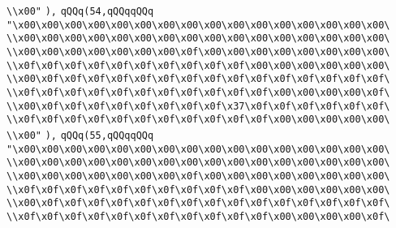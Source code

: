 \verb|\\x00"|\newline
\verb|),|\newline
\verb|qQQq(54,qQQqqQQq|\newline
\verb|"\x00\x00\x00\x00\x00\x00\x00\x00\x00\x00\x00\x00\x00\x00\x00\x00\|\newline
\verb|\\x00\x00\x00\x00\x00\x00\x00\x00\x00\x00\x00\x00\x00\x00\x00\x00\|\newline
\verb|\\x00\x00\x00\x00\x00\x00\x00\x0f\x00\x00\x00\x00\x00\x00\x00\x00\|\newline
\verb|\\x0f\x0f\x0f\x0f\x0f\x0f\x0f\x0f\x0f\x0f\x00\x00\x00\x00\x00\x00\|\newline
\verb|\\x00\x0f\x0f\x0f\x0f\x0f\x0f\x0f\x0f\x0f\x0f\x0f\x0f\x0f\x0f\x0f\|\newline
\verb|\\x0f\x0f\x0f\x0f\x0f\x0f\x0f\x0f\x0f\x0f\x0f\x00\x00\x00\x00\x0f\|\newline
\verb|\\x00\x0f\x0f\x0f\x0f\x0f\x0f\x0f\x0f\x37\x0f\x0f\x0f\x0f\x0f\x0f\|\newline
\verb|\\x0f\x0f\x0f\x0f\x0f\x0f\x0f\x0f\x0f\x0f\x0f\x00\x00\x00\x00\x00\|\newline
\verb|\\x00"|\newline
\verb|),|\newline
\verb|qQQq(55,qQQqqQQq|\newline
\verb|"\x00\x00\x00\x00\x00\x00\x00\x00\x00\x00\x00\x00\x00\x00\x00\x00\|\newline
\verb|\\x00\x00\x00\x00\x00\x00\x00\x00\x00\x00\x00\x00\x00\x00\x00\x00\|\newline
\verb|\\x00\x00\x00\x00\x00\x00\x00\x0f\x00\x00\x00\x00\x00\x00\x00\x00\|\newline
\verb|\\x0f\x0f\x0f\x0f\x0f\x0f\x0f\x0f\x0f\x0f\x00\x00\x00\x00\x00\x00\|\newline
\verb|\\x00\x0f\x0f\x0f\x0f\x0f\x0f\x0f\x0f\x0f\x0f\x0f\x0f\x0f\x0f\x0f\|\newline
\verb|\\x0f\x0f\x0f\x0f\x0f\x0f\x0f\x0f\x0f\x0f\x0f\x00\x00\x00\x00\x0f\|\newline
